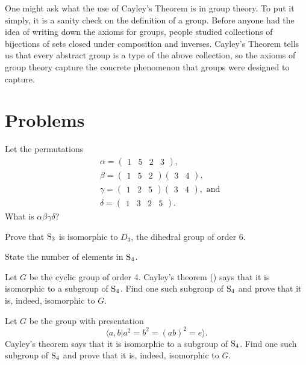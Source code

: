 One might ask what the use of Cayley's Theorem is in group theory. To put it simply, it is a sanity check on the definition of a group. Before anyone had the idea of writing down the axioms for groups, people studied collections of bijections of sets closed under composition and inverses. Cayley's Theorem tells us that every abstract group is a type of the above collection, so the axioms of group theory capture the concrete phenomenon that groups were designed to capture.

\newpage

\section{Problems}
\begin{problem}
    Let the permutations
    \begin{align*}
        &\alpha = \begin{pmatrix}1 & 5 & 2 & 3\end{pmatrix},\\
        &\beta  = \begin{pmatrix}1 & 5 & 2\end{pmatrix}\begin{pmatrix}3 & 4\end{pmatrix},\\
        &\gamma = \begin{pmatrix}1 & 2 & 5\end{pmatrix}\begin{pmatrix}3 & 4\end{pmatrix}, \text{ and}\\
        &\delta = \begin{pmatrix}1 & 3 & 2 & 5\end{pmatrix}.
    \end{align*}
    What is $\alpha\beta\gamma\delta$?
\end{problem}

\begin{problem}
    Prove that $\mathrm{S}_{3}$ is isomorphic to $D_3$, the dihedral group of order 6.
\end{problem}

\begin{problem}
    State the number of elements in $\mathrm{S}_{4}$.
    \begin{partquestions}{\alph*}
        \item Let $G$ be the cyclic group of order 4. Cayley's theorem () says that it is isomorphic to a subgroup of $\mathrm{S}_{4}$. Find one such subgroup of $\mathrm{S}_{4}$ and prove that it is, indeed, isomorphic to $G$.
        \item Let $G$ be the group with presentation
        \[
            \langle a, b \vert a^2 = b^2 = (ab)^2 = e \rangle.
        \]
        Cayley's theorem says that it is isomorphic to a subgroup of $\mathrm{S}_{4}$. Find one such subgroup of $\mathrm{S}_{4}$ and prove that it is, indeed, isomorphic to $G$.
    \end{partquestions}
\end{problem}

